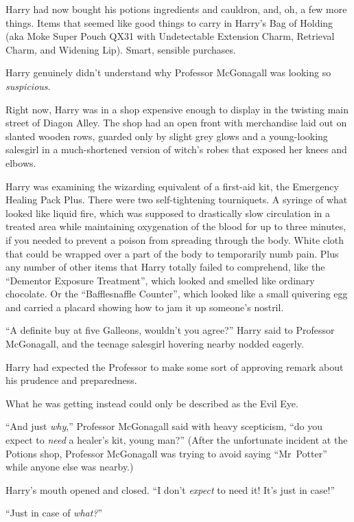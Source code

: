 \later

Harry had now bought his potions ingredients and cauldron, and, oh, a few more things. Items that seemed like good things to carry in Harry’s Bag of Holding (aka Moke Super Pouch QX31 with Undetectable Extension Charm, Retrieval Charm, and Widening Lip). Smart, sensible purchases.

Harry genuinely didn’t understand why Professor McGonagall was looking so \emph{suspicious}.

Right now, Harry was in a shop expensive enough to display in the twisting main street of Diagon Alley. The shop had an open front with merchandise laid out on slanted wooden rows, guarded only by slight grey glows and a young-looking salesgirl in a much-shortened version of witch’s robes that exposed her knees and elbows.

Harry was examining the wizarding equivalent of a first-aid kit, the Emergency Healing Pack Plus. There were two self-tightening tourniquets. A syringe of what looked like liquid fire, which was supposed to drastically slow circulation in a treated area while maintaining oxygenation of the blood for up to three minutes, if you needed to prevent a poison from spreading through the body. White cloth that could be wrapped over a part of the body to temporarily numb pain. Plus any number of other items that Harry totally failed to comprehend, like the “Dementor Exposure Treatment”, which looked and smelled like ordinary chocolate. Or the “Bafflesnaffle Counter”, which looked like a small quivering egg and carried a placard showing how to jam it up someone’s nostril.

“A definite buy at five Galleons, wouldn’t you agree?” Harry said to Professor McGonagall, and the teenage salesgirl hovering nearby nodded eagerly.

Harry had expected the Professor to make some sort of approving remark about his prudence and preparedness.

What he was getting instead could only be described as the Evil Eye.

“And just \emph{why},” Professor McGonagall said with heavy scepticism, “do you expect to \emph{need} a healer’s kit, young man?” (After the unfortunate incident at the Potions shop, Professor McGonagall was trying to avoid saying “Mr~Potter” while anyone else was nearby.)

Harry’s mouth opened and closed. “I don’t \emph{expect} to need it! It’s just in case!”

“Just in case of \emph{what?}”

